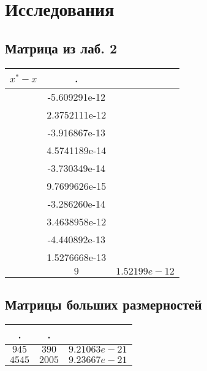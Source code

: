 \documentclass[oneside, final, 12pt]{extarticle}
\begin{document}
\lstset{caption=main.cc}


\section{Исследования}

\subsection{Матрица из лаб. 2}

\begin{tabular}{|c|c|c|} \hline
	\bf\(x^*-x\) & . &  \\ \hline
	\(\begin{aligned}
		& -5.609291e-12 \\
		& 2.3752111e-12 \\
		& -3.916867e-13 \\
		& 4.5741189e-14 \\
		& -3.730349e-14 \\
		& 9.7699626e-15 \\
		& -3.286260e-14 \\
		& 3.4638958e-12 \\
		& -4.440892e-13 \\
		& 1.5276668e-13 \\
	\end{aligned}\) & \(9\) & \(1.52199e-12\) \\ \hline
\end{tabular}

\subsection{Матрицы больших размерностей}

\begin{tabular}{|c|c|c|} \hline
	. & . &  \\ \hline
	\(945\) & \(390\) & \(9.21063e-21\) \\ \hline
	\(4545\) & \(2005\) & \(9.23667e-21\) \\ \hline
\end{tabular}
\end{document}

